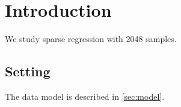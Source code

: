 \chapter{Introduction}
\label{chap:intro}
We study sparse regression with 2048 samples.
\section{Setting}
\label{sec:setting}
The data model is described in \cref{sec:model}.
